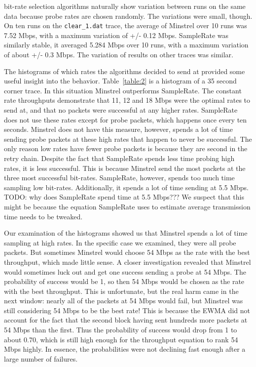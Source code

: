 \documentclass[letterpaper,twocolumn,10pt]{article}
\begin{document}
bit-rate selection algorithms naturally show variation between runs on the same data because probe rates are chosen randomly. The variations were small, though. On ten runs on the \texttt{clear\_1.dat} trace, the average of Minstrel over 10 runs was 7.52 Mbps, with a maximum variation of +/- 0.12 Mbps. SampleRate was similarly stable, it averaged 5.284 Mbps over 10 runs, with a maximum variation of about +/- 0.3 Mbps. The variation of results on other traces was similar.

The histograms of which rates the algorithms decided to send at provided some useful insight into the behavior. Table~\ref{table:2} is a histogram of a 35 second corner trace. In this situation Minstrel outperforms SampleRate. The constant rate throughputs demonstrate that 11, 12 and 18 Mbps were the optimal rates to send at, and that no packets were successful at any higher rates. SampleRate does not use these rates except for probe packets, which happens once every ten seconds. Minstrel does not have this measure, however, spends a lot of time sending probe packets at these high rates that happen to never be successful. The only reason low rates have fewer probe packets is because they are second in the retry chain. Despite the fact that SampleRate spends less time probing high rates, it is less successful. This is because Minstrel send the most packets at the three most successful bit-rates. SampleRate, however, spends too much time sampling low bit-rates. Additionally, it spends a lot of time sending at 5.5 Mbps. TODO: why does SampleRate spend time at 5.5 Mbps??? We suspect that this might be because the equation SampleRate uses to estimate average transmission time needs to be tweaked. 

Our examination of the histograms showed us that Minstrel spends a lot of time sampling at high rates. In the specific case we examined, they were all probe packets. But sometimes Minstrel would choose 54 Mbps as the rate with the best throughput, which made little sense. A closer investigation revealed that Minstrel would sometimes luck out and get one success sending a probe at 54 Mbps. The probability of success would be 1, so then 54 Mbps would be chosen as the rate with the best throughput. This is unfortunate, but the real harm came in the next window: nearly all of the packets at 54 Mbps would fail, but Minstrel was still considering 54 Mbps to be the best rate! This is because the EWMA did not account for the fact that the second block having sent hundreds more packets at 54 Mbps than the first. Thus the probability of success would drop from 1 to about 0.70, which is still high enough for the throughput equation to rank 54 Mbps highly. In essence, the probabilities were not declining fast enough after a large number of failures.
\end{document}
